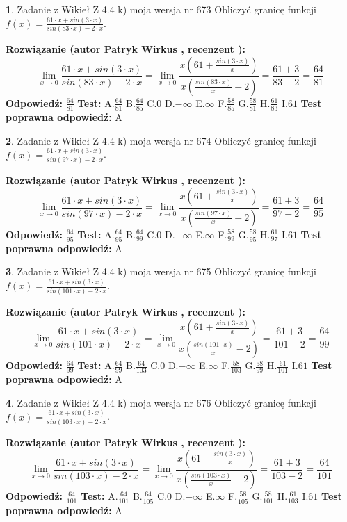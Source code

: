 \documentclass[12pt, a4paper]{article}
\theoremstyle{definition} %
\newtheorem{zad}{}
\newcommand{\zadStart}[1]{\begin{zad}#1\newline}
\newcommand{\zadStop}{\end{zad}}
\newcommand{\rozwStart}[2]{\noindent \textbf{Rozwiązanie (autor #1 , recenzent #2): }\newline}
\newcommand{\rozwStop}{\newline}
\newcommand{\odpStart}{\noindent \textbf{Odpowiedź:}\newline}
\newcommand{\odpStop}{\newline}
\newcommand{\testStart}{\noindent \textbf{Test:}\newline}
\newcommand{\testStop}{\newline}
\newcommand{\kluczStart}{\noindent \textbf{Test poprawna odpowiedź:}\newline}
\newcommand{\kluczStop}{\newline}
\begin{document}
\zadStart{Zadanie z Wikieł Z 4.4 k) moja wersja nr 673}
Obliczyć granicę funkcji $f(x)=\frac{61\cdot x +sin(3\cdot x)}{sin(83\cdot x) -2\cdot x}$.
\zadStop
\rozwStart{Patryk Wirkus}{}
$$\lim\limits_{x\to 0}\frac{61\cdot x +sin(3\cdot x)}{sin(83\cdot x) -2\cdot x}
=\lim\limits_{x\to 0}\frac{x(61+\frac{sin(3\cdot x)}{x})}{x(\frac{sin(83\cdot x)}{x}-2)}
=\frac{61+3}{83-2} = \frac{64}{81}$$
\rozwStop
\odpStart
$\frac{64}{81}$
\odpStop
\testStart
A.$\frac{64}{81}$
B.$\frac{64}{85}$
C.$0$
D.$-\infty$
E.$\infty$
F.$\frac{58}{85}$
G.$\frac{58}{81}$
H.$\frac{61}{83}$
I.$61$
\testStop
\kluczStart
A
\kluczStop



\zadStart{Zadanie z Wikieł Z 4.4 k) moja wersja nr 674}
Obliczyć granicę funkcji $f(x)=\frac{61\cdot x +sin(3\cdot x)}{sin(97\cdot x) -2\cdot x}$.
\zadStop
\rozwStart{Patryk Wirkus}{}
$$\lim\limits_{x\to 0}\frac{61\cdot x +sin(3\cdot x)}{sin(97\cdot x) -2\cdot x}
=\lim\limits_{x\to 0}\frac{x(61+\frac{sin(3\cdot x)}{x})}{x(\frac{sin(97\cdot x)}{x}-2)}
=\frac{61+3}{97-2} = \frac{64}{95}$$
\rozwStop
\odpStart
$\frac{64}{95}$
\odpStop
\testStart
A.$\frac{64}{95}$
B.$\frac{64}{99}$
C.$0$
D.$-\infty$
E.$\infty$
F.$\frac{58}{99}$
G.$\frac{58}{95}$
H.$\frac{61}{97}$
I.$61$
\testStop
\kluczStart
A
\kluczStop



\zadStart{Zadanie z Wikieł Z 4.4 k) moja wersja nr 675}
Obliczyć granicę funkcji $f(x)=\frac{61\cdot x +sin(3\cdot x)}{sin(101\cdot x) -2\cdot x}$.
\zadStop
\rozwStart{Patryk Wirkus}{}
$$\lim\limits_{x\to 0}\frac{61\cdot x +sin(3\cdot x)}{sin(101\cdot x) -2\cdot x}
=\lim\limits_{x\to 0}\frac{x(61+\frac{sin(3\cdot x)}{x})}{x(\frac{sin(101\cdot x)}{x}-2)}
=\frac{61+3}{101-2} = \frac{64}{99}$$
\rozwStop
\odpStart
$\frac{64}{99}$
\odpStop
\testStart
A.$\frac{64}{99}$
B.$\frac{64}{103}$
C.$0$
D.$-\infty$
E.$\infty$
F.$\frac{58}{103}$
G.$\frac{58}{99}$
H.$\frac{61}{101}$
I.$61$
\testStop
\kluczStart
A
\kluczStop



\zadStart{Zadanie z Wikieł Z 4.4 k) moja wersja nr 676}
Obliczyć granicę funkcji $f(x)=\frac{61\cdot x +sin(3\cdot x)}{sin(103\cdot x) -2\cdot x}$.
\zadStop
\rozwStart{Patryk Wirkus}{}
$$\lim\limits_{x\to 0}\frac{61\cdot x +sin(3\cdot x)}{sin(103\cdot x) -2\cdot x}
=\lim\limits_{x\to 0}\frac{x(61+\frac{sin(3\cdot x)}{x})}{x(\frac{sin(103\cdot x)}{x}-2)}
=\frac{61+3}{103-2} = \frac{64}{101}$$
\rozwStop
\odpStart
$\frac{64}{101}$
\odpStop
\testStart
A.$\frac{64}{101}$
B.$\frac{64}{105}$
C.$0$
D.$-\infty$
E.$\infty$
F.$\frac{58}{105}$
G.$\frac{58}{101}$
H.$\frac{61}{103}$
I.$61$
\testStop
\kluczStart
A
\kluczStop
\end{document}
